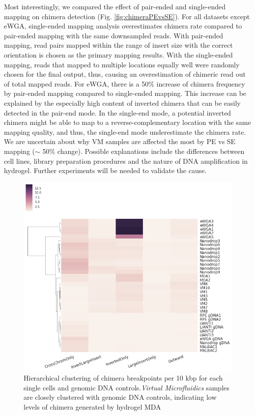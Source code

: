 Most interestingly, we compared the effect of pair-ended and single-ended mapping on chimera detection (Fig. \ref{fig:chimeraPEvsSE}). For all datasets except eWGA, single-ended mapping analysis overestimates chimera rate compared to pair-ended mapping with the same downsampled reads. With pair-ended mapping, read pairs mapped within the range of insert size with the correct orientation is chosen as the primary mapping results. With the single-ended mapping, reads that mapped to multiple locations equally well were randomly chosen for the final output, thus, causing an overestimation of chimeric read out of total mapped reads. For eWGA, there is a 50\% increase of chimera frequency by pair-ended mapping compared to single-ended mapping. This increase can be explained by the especially high content of inverted chimera that can be easily detected in the pair-end mode. In the single-end mode, a potential inverted chimera might be able to map to a reverse-complementary location with the same mapping quality, and thus, the single-end mode underestimate the chimera rate. We are uncertain about why VM samples are affected the most by PE vs SE mapping ($\sim$ 50\% change). Possible explanations include the differences between cell lines, library preparation procedures and the nature of DNA amplification in hydrogel. Further experiments will be needed to validate the cause. 

\begin{figure}
\centering
\includegraphics[keepaspectratio,width=1\textwidth]{./figures/20170822_BreakpointPer10kbp_Clustermap_QFiltered}
\caption[Hierarchical clustering of chimera breakpoints per 10 kbp.]{Hierarchical clustering of chimera breakpoints per 10 kbp for each single cells and genomic DNA controls.\textit{Virtual Microfluidics} samples are closely clustered with genomic DNA controls, indicating low levels of chimera generated by hydrogel MDA}
\label{fig:chimeraCluster}
\end{figure}

